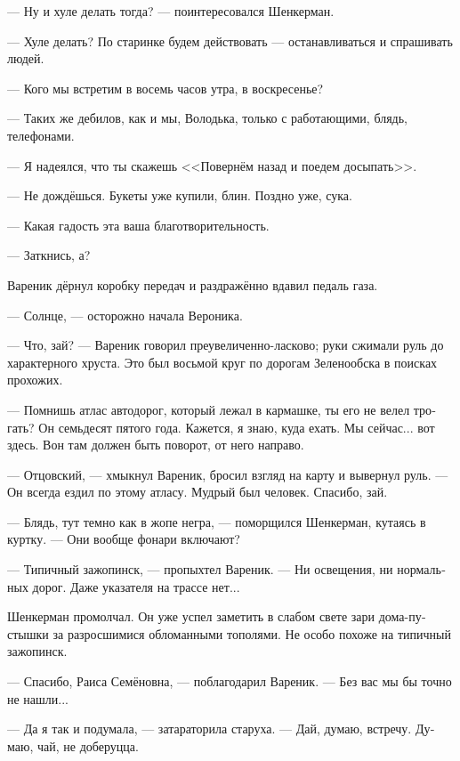\documentclass[a5paper,12pt,fleqn]{extbook}\usepackage{cooltooltips}\usepackage{polyglossia}\setdefaultlanguage[babelshorthands=true]{russian}\setotherlanguage{english}\defaultfontfeatures{Ligatures=TeX,Mapping=tex-text} \usepackage{xcolor}\definecolor{lightgray}{HTML}{bbbbbb}\color{lightgray}\newcommand{\ml}[3]{\textenglish{\textcolor{black}{#3}}}
\newcommand{\asterism}{\vspace{1em}{\centering\Large\bfseries$\ast~\ast~\ast$\par}\vspace{1em}}
\newcommand{\textspace}{\vspace{1em}{\centering\Large\bfseries<...>\par}\vspace{1em}}
\begin{document}
--- Ну и хуле делать тогда? --- поинтересовался Шенкерман.

--- Хуле делать?
По старинке будем действовать --- останавливаться и спрашивать людей.

--- Кого мы встретим в восемь часов утра, в воскресенье?

--- Таких же дебилов, как и мы, Володька, только с работающими, блядь, телефонами.

--- Я надеялся, что ты скажешь <<Повернём назад и поедем досыпать>>.

--- Не дождёшься.
Букеты уже купили, блин.
Поздно уже, сука.

--- Какая гадость эта ваша благотворительность.

--- Заткнись, а?

Вареник дёрнул коробку передач и раздражённо вдавил педаль газа.

\asterism

\textspace

--- Солнце, --- осторожно начала Вероника.

--- Что, зай? --- Вареник говорил преувеличенно-ласково;
руки сжимали руль до характерного хруста.
Это был восьмой круг по дорогам Зеленообска в поисках прохожих.

--- Помнишь атлас автодорог, который лежал в кармашке, ты его не велел трогать?
Он семьдесят пятого года.
Кажется, я знаю, куда ехать.
Мы сейчас... вот здесь.
Вон там должен быть поворот, от него направо.

--- Отцовский, --- хмыкнул Вареник, бросил взгляд на карту и вывернул руль.
--- Он всегда ездил по этому атласу.
Мудрый был человек.
Спасибо, зай.

--- Блядь, тут темно как в жопе негра, --- поморщился Шенкерман, кутаясь в куртку.
--- Они вообще фонари включают?

--- Типичный зажопинск, --- пропыхтел Вареник.
--- Ни освещения, ни нормальных дорог.
Даже указателя на трассе нет...

Шенкерман промолчал.
Он уже успел заметить в слабом свете зари дома-пустышки за разросшимися обломанными тополями.
Не особо похоже на типичный зажопинск.

\asterism

\textspace

--- Спасибо, Раиса Семёновна, --- поблагодарил Вареник.
--- Без вас мы бы точно не нашли...

--- Да я так и подумала, --- затараторила старуха.
--- Дай, думаю, встречу.
Думаю, чай, не доберуцца.
\end{document}
